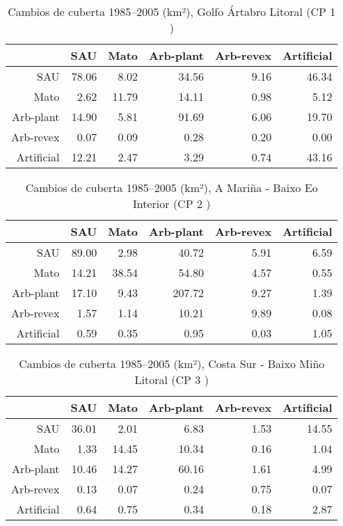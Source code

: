 \begin{table}[p]
\centering
\caption{Cambios de cuberta 1985--2005 (km²), Golfo Ártabro Litoral (CP 1 )} 
\label{TaboaContinxCP1}
\begin{tabular}{rrrrrr}
  \hline
 & SAU & Mato & Arb-plant & Arb-revex & Artificial \\ 
  \hline
SAU & 78.06 & 8.02 & 34.56 & 9.16 & 46.34 \\ 
  Mato & 2.62 & 11.79 & 14.11 & 0.98 & 5.12 \\ 
  Arb-plant & 14.90 & 5.81 & 91.69 & 6.06 & 19.70 \\ 
  Arb-revex & 0.07 & 0.09 & 0.28 & 0.20 & 0.00 \\ 
  Artificial & 12.21 & 2.47 & 3.29 & 0.74 & 43.16 \\ 
   \hline
\end{tabular}
\end{table}
\begin{table}[p]
\centering
\caption{Cambios de cuberta 1985--2005 (km²), A Mariña - Baixo Eo Interior (CP 2 )} 
\label{TaboaContinxCP2}
\begin{tabular}{rrrrrr}
  \hline
 & SAU & Mato & Arb-plant & Arb-revex & Artificial \\ 
  \hline
SAU & 89.00 & 2.98 & 40.72 & 5.91 & 6.59 \\ 
  Mato & 14.21 & 38.54 & 54.80 & 4.57 & 0.55 \\ 
  Arb-plant & 17.10 & 9.43 & 207.72 & 9.27 & 1.39 \\ 
  Arb-revex & 1.57 & 1.14 & 10.21 & 9.89 & 0.08 \\ 
  Artificial & 0.59 & 0.35 & 0.95 & 0.03 & 1.05 \\ 
   \hline
\end{tabular}
\end{table}
\begin{table}[p]
\centering
\caption{Cambios de cuberta 1985--2005 (km²), Costa Sur - Baixo Miño Litoral (CP 3 )} 
\label{TaboaContinxCP3}
\begin{tabular}{rrrrrr}
  \hline
 & SAU & Mato & Arb-plant & Arb-revex & Artificial \\ 
  \hline
SAU & 36.01 & 2.01 & 6.83 & 1.53 & 14.55 \\ 
  Mato & 1.33 & 14.45 & 10.34 & 0.16 & 1.04 \\ 
  Arb-plant & 10.46 & 14.27 & 60.16 & 1.61 & 4.99 \\ 
  Arb-revex & 0.13 & 0.07 & 0.24 & 0.75 & 0.07 \\ 
  Artificial & 0.64 & 0.75 & 0.34 & 0.18 & 2.87 \\ 
   \hline
\end{tabular}
\end{table}
